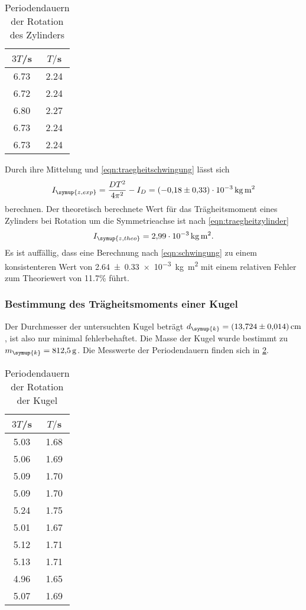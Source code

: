 \begin{table}
\centering
\caption{Periodendauern der Rotation des Zylinders}
\label{tab:zylinder}
\begin{tabular}{c c}
\toprule
$3T$/s & $T/$s \\
\midrule
6.73 & 2.24 \\
6.72 & 2.24 \\
6.80 & 2.27 \\
6.73 & 2.24 \\
6.73 & 2.24 \\
\bottomrule
\end{tabular}
\end{table}

Durch ihre Mittelung und \eqref{eqn:traegheitschwingung} lässt sich
\begin{equation}
  I_{\symup{z,exp}} = \frac{DT^2}{4\pi^2}-I_D = \SI{-0.18(033)e-3}{\kilogram\meter\squared}
\end{equation}
berechnen. Der theoretisch berechnete Wert für das Trägheitsmoment eines Zylinders
bei Rotation um die Symmetrieachse ist nach \eqref{eqn:traegheitzylinder}
\begin{equation}
  I_{\symup{z,theo}} = \SI{2.99e-3}{\kilogram\meter\squared}.
\end{equation}
Es ist auffällig, dass eine Berechnung nach \eqref{eqn:schwingung} zu einem
konsistenteren Wert von \SI{2.64(033)e-3}{\kilogram\meter\squared} mit einem
relativen Fehler zum Theoriewert von 11.7\% führt.

\subsubsection{Bestimmung des Trägheitsmoments einer Kugel}
Der Durchmesser der untersuchten Kugel beträgt $d_{\symup{k}}=\SI{13.724(0014)}{\cm}$,
ist also nur minimal fehlerbehaftet. Die Masse der Kugel wurde bestimmt zu
$m_{\symup{k}}=\SI{812.5}{\gram}$. Die Messwerte der Periodendauern finden sich
in \ref{tab:kugel}.

\begin{table}
\centering
\caption{Periodendauern der Rotation der Kugel}
\label{tab:kugel}
\begin{tabular}{c c}
\toprule
$3T$/s & $T/$s \\
\midrule
5.03 & 1.68 \\
5.06 & 1.69 \\
5.09 & 1.70 \\
5.09 & 1.70 \\
5.24 & 1.75 \\
5.01 & 1.67 \\
5.12 & 1.71 \\
5.13 & 1.71 \\
4.96 & 1.65 \\
5.07 & 1.69 \\
\bottomrule
\end{tabular}
\end{table}

